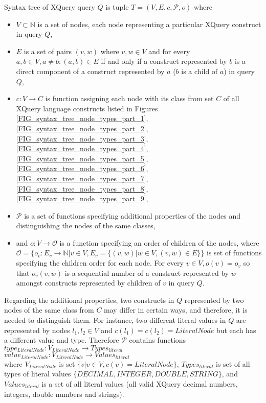 \begin{define}
\label{DEF_syntax_tree}
Syntax tree of XQuery query $Q$ is tuple $T = (V, E, c, \mathcal{P}, o)$ where
\begin{itemize}
\item $V \subset \mathbb{N}$ is a set of nodes, each node representing a particular XQuery construct in query $Q$,
\item $E$ is a set of pairs $(v, w)$ where $v,w \in V$ and for every $a, b \in V, a \neq b: (a, b) \in E$ if and only if a construct represented by $b$ is a direct component of a construct represented by $a$ ($b$ is a child of $a$) in query $Q$,
\item $c: V \rightarrow C$ is function assigning each node with its class from set $C$ of all XQuery language constructs listed in Figures \ref{FIG_syntax_tree_node_types_part_1}, \ref{FIG_syntax_tree_node_types_part_2}, \ref{FIG_syntax_tree_node_types_part_3}, \ref{FIG_syntax_tree_node_types_part_4}, \ref{FIG_syntax_tree_node_types_part_5}, \ref{FIG_syntax_tree_node_types_part_6}, \ref{FIG_syntax_tree_node_types_part_7}, \ref{FIG_syntax_tree_node_types_part_8}, \ref{FIG_syntax_tree_node_types_part_9}, 
\item $\mathcal{P}$ is a set of functions specifying additional properties of the nodes and distinguishing the nodes of the same classes,
\item and $o : V \rightarrow \mathcal{O}$ is a function specifying an order of children of the nodes, where $\mathcal{O} = \{o_v : E_v \rightarrow \mathbb{N} | v \in V, E_v = \{(v, w) | w \in V, (v,w) \in E\}\}$ is set of functions specifying the children order for each node. For every $v \in V, o(v) = o_v$ so that $o_v(v,w)$ is a sequential number of a construct represented by $w$ amongst constructs represented by children of $v$ in query $Q$.
\end{itemize}
\end{define}

Regarding the additional properties, two constructs in $Q$ represented by two nodes of the same class from $C$ may differ in certain ways, and therefore, it is needed to distinguish them. For instance, two different literal values in $Q$ are represented by nodes $l_1, l_2 \in V$ and $c(l_1) = c(l_2) = LiteralNode$ but each has a different value and type. Therefore $\mathcal{P}$ contains functions \\
$type_{LiteralNode}: V_{LiteralNode} \rightarrow Types_{literal}$ \\
$value_{LiteralNode}: V_{LiteralNode} \rightarrow Values_{literal}$ \\
where $V_{LiteralNode}$ is set $\{v | v \in V, c(v) = LiteralNode\}$, $Types_{literal}$ is set of all types of literal values $\{DECIMAL, INTEGER, DOUBLE, STRING\}$, and $Values_{literal}$ is a set of all literal values (all valid XQuery decimal numbers, integers, double numbers and strings).

